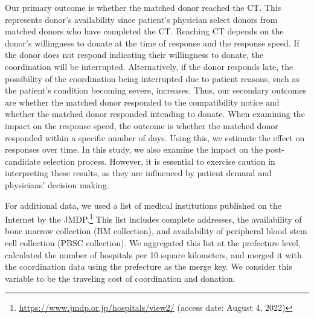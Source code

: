 \documentclass[12pt, a4paper]{article}
\begin{document}
Our primary outcome is whether the matched donor reached the CT. This represents donor's availability since patient's physician select donors from matched donors who have completed the CT. Reaching CT depends on the donor's willingness to donate at the time of response and the response speed. If the donor does not respond indicating their willingness to donate, the coordination will be interrupted. Alternatively, if the donor responds late, the possibility of the coordination being interrupted due to patient reasons, such as the patient's condition becoming severe, increases. Thus, our secondary outcomes are whether the matched donor responded to the compatibility notice and whether the matched donor responded intending to donate. When examining the impact on the response speed, the outcome is whether the matched donor responded within a specific number of days. Using this, we estimate the effect on responses over time. In this study, we also examine the impact on the post-candidate selection process. However, it is essential to exercise caution in interpreting these results, as they are influenced by patient demand and physicians' decision making.

For additional data, we used a list of medical institutions published on the Internet by the JMDP.\footnote{\url{https://www.jmdp.or.jp/hospitals/view2/} (access date: August 4, 2022)} This list includes complete addresses, the availability of bone marrow collection (BM collection), and availability of peripheral blood stem cell collection (PBSC collection). We aggregated this list at the prefecture level, calculated the number of hospitals per 10 square kilometers, and merged it with the coordination data using the prefecture as the merge key. We consider this variable to be the traveling cost of coordination and donation.
\end{document}
